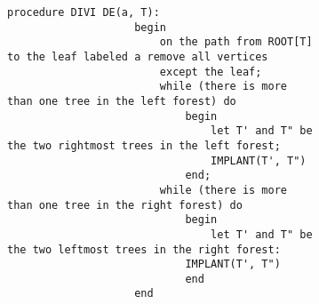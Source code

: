\documentclass{subfiles}
\begin{document}
\begin{figure}[!h]
    \centering
    \begin{subfigure}[b]{0.95\textwidth}
        \begin{lstlisting}[language = algol]
                procedure DIVI DE(a, T):
                    begin
                        on the path from ROOT[T] to the leaf labeled a remove all vertices
                        except the leaf;
                        while (there is more than one tree in the left forest) do
                            begin
                                let T' and T" be the two rightmost trees in the left forest;
                                IMPLANT(T', T")
                            end;
                        while (there is more than one tree in the right forest) do
                            begin
                                let T' and T" be the two leftmost trees in the right forest:
                            IMPLANT(T', T")
                            end
                    end       
            \end{lstlisting}
    \end{subfigure}
    \label{Fig:}
\end{figure}
\end{document}
